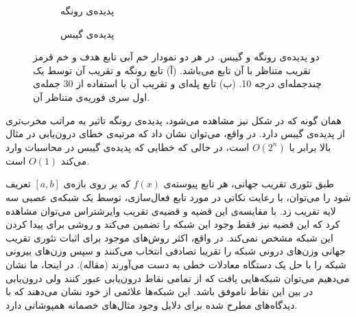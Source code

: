 \documentclass[12pt,onecolumn,a4paper]{article}
\begin{document}
 \begin{figure}
    \centering
    \begin{subfigure}[b]{0.45\textwidth}
        \centering
        \caption{پدیده‌ی رونگه}
        \label{fig:runge}
    \end{subfigure}
    \hfill
    \begin{subfigure}[b]{0.45\textwidth}
        \centering
        \caption{پدیده‌ی گیبس}
        \label{fig:gibbs}
    \end{subfigure}
       \caption{دو پدیده‌ی رونگه و گیبس. در هر دو نمودار خم آبی تابع هدف و خم قرمز تقریب متناظر با آن تابع می‌باشد. (آ) تابع رونگه و تقریب آن توسط یک چندجمله‌ای درجه 10. (ب) تابع پله‌ای و تقریب آن با استفاده از 30 جمله‌ی اول سری فوریه‌ی متناظر آن.}
       \label{fig:runge_gibbs}
\end{figure}

همان گونه که در شکل نیز مشاهده می‌شود، پدیده‌ی رونگه تاثیر به مراتب مخرب‌تری از پدیده‌ی گیبس دارد. در واقع، می‌توان نشان داد که مرتبه‌ی خطای درون‌یابی در مثال بالا برابر با 
$O(2^n‌)$ 
است، در حالی که خطایی که پدیده‌ی گیبس در محاسبات وارد می‌کند 
$O(1)$ 
است.

طبق تئوری تقریب جهانی، هر تابع پیوسته‌ی $f(x)$ که بر روی بازه‌ی $[a,b]$ تعریف شود را می‌توان، با رعایت نکاتی در مورد تابع فعال‌سازی، توسط یک شبکه‌ی عصبی سه لایه تقریب زد. با مقایسه‌ی این قضیه و قضیه‌ی تقریب وایرشتراس می‌توان مشاهده کرد که این قضیه نیز فقط وجود این شبکه را تضمین می‌کند و روشی برای پیدا کردن این شبکه مشخص نمی‌کند. در واقع، اکثر روش‌های موجود برای اثبات تئوری تقریب جهانی وزن‌های درونی شبکه را تقریبا تصادفی انتخاب می‌کنند و سپس وزن‌های بیرونی شبکه را با حل یک دستگاه معادلات خطی به دست می‌آورند (مقاله). در اینجا، ما نشان می‌دهیم می‌توان شبکه‌هایی یافت که از تمامی نقاط درون‌یابی عبور کنند ولی درون‌یابی در بین این نقاط ناموفق باشد. این شبکه‌ها علائمی از خود نشان می‌دهند که با دیدگاه‌های مطرح شده برای دلایل وجود مثال‌های خصمانه همپوشانی دارد.
\end{document}

